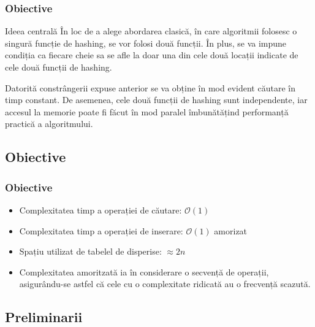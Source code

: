 \documentclass{beamer}
\begin{document}
\begin{frame}
\frametitle{Obiective}

\begin{block}{Ideea centrală}
În loc de a alege abordarea clasică, în care algoritmii folosesc o singură funcție de hashing, se vor folosi două funcții. În plus, se va impune condiția ca fiecare cheie sa se afle la doar una din cele două locații indicate de cele două funcții de hashing.
\end{block}


Datorită constrângerii expuse anterior se va obține în mod evident căutare în timp constant. De asemenea, cele două funcții de hashing sunt independente, iar accesul la memorie poate fi făcut în mod paralel îmbunătățind performanță practică a algoritmului.

\end{frame}
\subsection{Obiective}

\begin{frame}
\frametitle{Obiective}
\begin{itemize}
\item Complexitatea timp a operației de căutare: $\mathcal{O}(1)$
\item Complexitatea timp a operației de inserare: $\mathcal{O}(1)$ amorizat
\item Spațiu utilizat de tabelel de disperise: $\approx 2n$

\item Complexitatea amoritzată ia în considerare o secvență de operații, asigurându-se astfel că cele cu o complexitate ridicată au o frecvență scazută.
\end{itemize}

\end{frame}
\subsection{Preliminarii}
\end{document}
